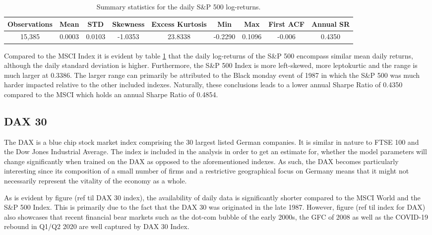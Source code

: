 \begin{table}[H]
\caption{Summary statistics for the daily S\&P 500 log-returns.}
\centering
\begin{tabular}{c c c c c c c c c} 
\hline\hline
Observations & Mean & STD & Skewness & Excess Kurtosis & Min & Max & First ACF & Annual SR \\
\hline
15,385 & 0.0003 & 0.0103 & -1.0353 & 23.8338 & -0.2290 & 0.1096 & -0.006 & 0.4350 \\
\hline
\end{tabular}
\label{tab:summary_stats_S&P500}
\end{table}
 
Compared to the MSCI Index it is evident by table \ref{tab:summary_stats_S&P500} that the daily log-returns of the S\&P 500 encompass similar mean daily returns, although the daily standard deviation is higher. Furthermore, the S\&P 500 Index is more left-skewed, more leptokurtic and the range is much larger at 0.3386. The larger range can primarily be attributed to the Black monday event of 1987 in which the S\&P 500 was much harder impacted relative to the other included indexes. Naturally, these conclusions leads to a lower annual Sharpe Ratio of 0.4350 compared to the MSCI which holds an annual Sharpe Ratio of 0.4854.
 
\subsection{DAX 30}
\label{subsection: DAX 30}
The DAX is a blue chip stock market index comprising the 30 largest listed German companies. It is similar in nature to FTSE 100 and the Dow Jones Industrial Average. The index is included in the analysis in order to get an estimate for, whether the model parameters will change significantly when trained on the DAX as opposed to the aforementioned indexes. As such, the DAX becomes particularly interesting since its composition of a small number of firms and a restrictive geographical focus on Germany means that it might not necessarily represent the vitality of the economy as a whole. 


As is evident by figure (ref til DAX 30 index), the availability of daily data is significantly shorter compared to the MSCI World and the S\&P 500 Index. This is primarily due to the fact that the DAX 30 was originated in the late 1987. However, figure (ref til index for DAX) also showcases that recent financial bear markets such as the dot-com bubble of the early 2000s, the GFC of 2008 as well as the COVID-19 rebound in Q1/Q2 2020 are well captured by DAX 30 Index. 

